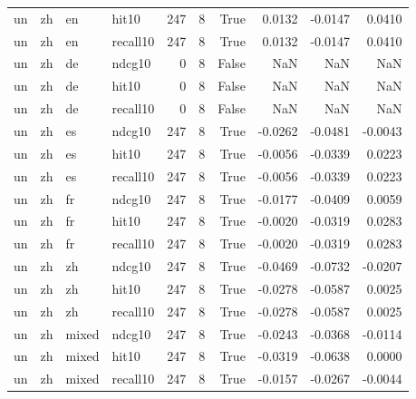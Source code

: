 \begin{tabular}{llllrrrrrr}
un & zh & en & hit10 & 247 & 8 & True & 0.0132 & -0.0147 & 0.0410 \\
un & zh & en & recall10 & 247 & 8 & True & 0.0132 & -0.0147 & 0.0410 \\
un & zh & de & ndcg10 & 0 & 8 & False & NaN & NaN & NaN \\
un & zh & de & hit10 & 0 & 8 & False & NaN & NaN & NaN \\
un & zh & de & recall10 & 0 & 8 & False & NaN & NaN & NaN \\
un & zh & es & ndcg10 & 247 & 8 & True & -0.0262 & -0.0481 & -0.0043 \\
un & zh & es & hit10 & 247 & 8 & True & -0.0056 & -0.0339 & 0.0223 \\
un & zh & es & recall10 & 247 & 8 & True & -0.0056 & -0.0339 & 0.0223 \\
un & zh & fr & ndcg10 & 247 & 8 & True & -0.0177 & -0.0409 & 0.0059 \\
un & zh & fr & hit10 & 247 & 8 & True & -0.0020 & -0.0319 & 0.0283 \\
un & zh & fr & recall10 & 247 & 8 & True & -0.0020 & -0.0319 & 0.0283 \\
un & zh & zh & ndcg10 & 247 & 8 & True & -0.0469 & -0.0732 & -0.0207 \\
un & zh & zh & hit10 & 247 & 8 & True & -0.0278 & -0.0587 & 0.0025 \\
un & zh & zh & recall10 & 247 & 8 & True & -0.0278 & -0.0587 & 0.0025 \\
un & zh & mixed & ndcg10 & 247 & 8 & True & -0.0243 & -0.0368 & -0.0114 \\
un & zh & mixed & hit10 & 247 & 8 & True & -0.0319 & -0.0638 & 0.0000 \\
un & zh & mixed & recall10 & 247 & 8 & True & -0.0157 & -0.0267 & -0.0044 \\
\bottomrule
\end{tabular}
